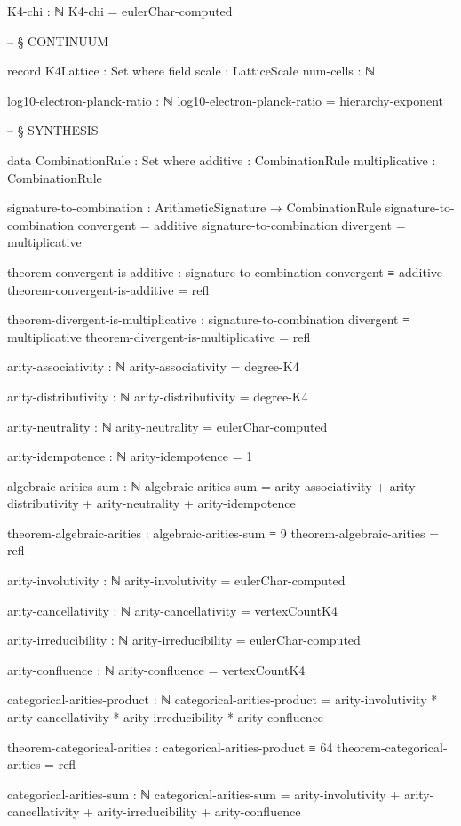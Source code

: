\documentclass[11pt,a4paper]{book}
\begin{document}
\begin{code}
  K4-chi : ℕ
  K4-chi = eulerChar-computed


-- § CONTINUUM


record K4Lattice : Set where
  field
    scale : LatticeScale
    num-cells : ℕ

log10-electron-planck-ratio : ℕ
log10-electron-planck-ratio = hierarchy-exponent


-- § SYNTHESIS

data CombinationRule : Set where
  additive       : CombinationRule
  multiplicative : CombinationRule

signature-to-combination : ArithmeticSignature → CombinationRule
signature-to-combination convergent = additive
signature-to-combination divergent  = multiplicative

theorem-convergent-is-additive : signature-to-combination convergent ≡ additive
theorem-convergent-is-additive = refl

theorem-divergent-is-multiplicative : signature-to-combination divergent ≡ multiplicative
theorem-divergent-is-multiplicative = refl

arity-associativity : ℕ
arity-associativity = degree-K4

arity-distributivity : ℕ
arity-distributivity = degree-K4

arity-neutrality : ℕ
arity-neutrality = eulerChar-computed

arity-idempotence : ℕ
arity-idempotence = 1

algebraic-arities-sum : ℕ
algebraic-arities-sum = arity-associativity + arity-distributivity 
                      + arity-neutrality + arity-idempotence

theorem-algebraic-arities : algebraic-arities-sum ≡ 9
theorem-algebraic-arities = refl

arity-involutivity : ℕ
arity-involutivity = eulerChar-computed

arity-cancellativity : ℕ
arity-cancellativity = vertexCountK4

arity-irreducibility : ℕ
arity-irreducibility = eulerChar-computed

arity-confluence : ℕ
arity-confluence = vertexCountK4

categorical-arities-product : ℕ
categorical-arities-product = arity-involutivity * arity-cancellativity 
                            * arity-irreducibility * arity-confluence

theorem-categorical-arities : categorical-arities-product ≡ 64
theorem-categorical-arities = refl

categorical-arities-sum : ℕ
categorical-arities-sum = arity-involutivity + arity-cancellativity 
                        + arity-irreducibility + arity-confluence


\end{code}
\end{document}
